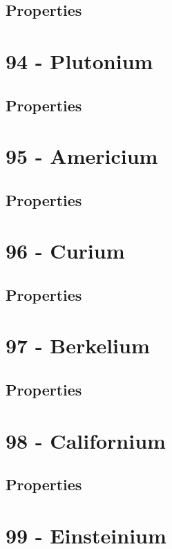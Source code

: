\documentclass{book}
\begin{document}
\subsection{Properties}

\section{94 - Plutonium}
\label{sec:elem-plutonium}
\subsection{Properties}

\section{95 - Americium}
\label{sec:elem-americium}
\subsection{Properties}

\section{96 - Curium}
\label{sec:elem-curium}
\subsection{Properties}

\section{97 - Berkelium}
\label{sec:elem-berkelium}
\subsection{Properties}

\section{98 - Californium}
\label{sec:elem-californium}
\subsection{Properties}

\section{99 - Einsteinium}
\label{sec:elem-einsteinium}
\end{document}
